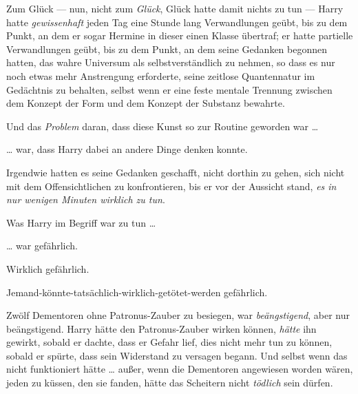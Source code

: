 Zum Glück — nun, nicht zum \emph{Glück}, Glück hatte damit nichts zu tun — Harry hatte \emph{gewissenhaft} jeden Tag eine Stunde lang Verwandlungen geübt, bis zu dem Punkt, an dem er sogar Hermine in dieser einen Klasse übertraf; er hatte partielle Verwandlungen geübt, bis zu dem Punkt, an dem seine Gedanken begonnen hatten, das wahre Universum als selbstverständlich zu nehmen, so dass es nur noch etwas mehr Anstrengung erforderte, seine zeitlose Quantennatur im Gedächtnis zu behalten, selbst wenn er eine feste mentale Trennung zwischen dem Konzept der Form und dem Konzept der Substanz bewahrte.

Und das \emph{Problem} daran, dass diese Kunst so zur Routine geworden war …

… war, dass Harry dabei an andere Dinge denken konnte.

Irgendwie hatten es seine Gedanken geschafft, nicht dorthin zu gehen, sich nicht mit dem Offensichtlichen zu konfrontieren, bis er vor der Aussicht stand, \emph{es in nur wenigen Minuten wirklich zu tun}.

Was Harry im Begriff war zu tun …

… war gefährlich.

Wirklich gefährlich.

Jemand-könnte-tatsächlich-wirklich-getötet-werden gefährlich.

Zwölf Dementoren ohne Patronus-Zauber zu besiegen, war \emph{beängstigend}, aber nur beängstigend. Harry hätte den Patronus-Zauber wirken können, \emph{hätte} ihn gewirkt, sobald er dachte, dass er Gefahr lief, dies nicht mehr tun zu können, sobald er spürte, dass sein Widerstand zu versagen begann. Und selbst wenn das nicht funktioniert hätte … außer, wenn die Dementoren angewiesen worden wären, jeden zu küssen, den sie fanden, hätte das Scheitern nicht \emph{tödlich} sein dürfen.

